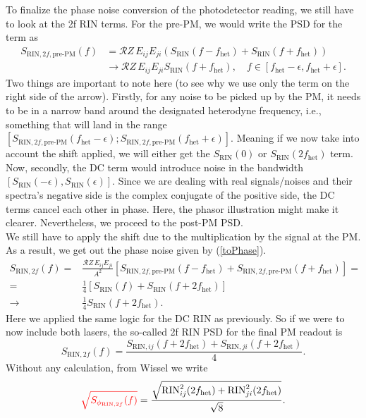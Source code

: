 \documentclass[11pt]{article}
\begin{document}
To finalize the phase noise conversion of the photodetector reading, we still have to look at the 2f RIN terms. For the pre-PM, we would write the PSD for the term as
\begin{align*}
    S_{\text{RIN},2f, \text{pre-PM}}(f) &= \mathcal{R} Z \, E_{ij} E_{ji}\left(S_{\text{RIN}}(f-f_{\text{het}})+S_{\text{RIN}}(f+f_{\text{het}})\right)\\[5pt]
    &\rightarrow \mathcal{R} Z \, E_{ij} E_{ji}S_{\text{RIN}}(f+f_{\text{het}}), \quad f\in[f_{\text{het}}-\epsilon, f_{\text{het}}+\epsilon].
\end{align*}
Two things are important to note here (to see why we use only the term on the right side of the arrow). Firstly, for any noise to be picked up by the PM, it needs to be in a narrow band around the designated heterodyne frequency, i.e., something that will land in the range $[S_{\text{RIN},2f, \text{pre-PM}}(f_{\text{het}}-\epsilon); S_{\text{RIN},2f, \text{pre-PM}}(f_{\text{het}}+\epsilon)]$. Meaning if we now take into account the shift applied, we will either get the $S_{\text{RIN}}(0)$ or $S_{\text{RIN}}(2f_{\text{het}})$ term. Now, secondly, the DC term would introduce noise in the bandwidth $[S_{\text{RIN}}(-\epsilon), S_{\text{RIN}}(\epsilon)]$. Since we are dealing with real signals/noises and their spectra's negative side is the complex conjugate of the positive side, the DC terms cancel each other in phase. Here, the phasor illustration might make it clearer. Nevertheless, we proceed to the post-PM PSD.\\
\newline
We still have to apply the shift due to the multiplication by the signal at the PM. As a result, we get out the phase noise given by (\ref{toPhase}).
\begin{align*}
    S_{\text{RIN},2f}(f) =& \frac{\mathcal{R} Z \, E_{ij} E_{ji}}{A^2}\left[S_{\text{RIN},2f, \text{pre-PM}}(f-f_{\text{het}})+ S_{\text{RIN},2f, \text{pre-PM}}(f+f_{\text{het}})\right]=\\[6pt]
    =& \frac{1}{4}\left[S_{\text{RIN}}(f)+S_{\text{RIN}}(f+2f_{\text{het}})\right]\\[6pt]
    \rightarrow& \frac{1}{4}S_{\text{RIN}}(f+2f_{\text{het}}).
\end{align*}
Here we applied the same logic for the DC RIN as previously. So if we were to now include both lasers, the so-called 2f RIN PSD for the final PM readout is 
\begin{equation*}
    S_{\text{RIN},2f}(f)=\frac{S_{\text{RIN}, ij}(f+2f_{\text{het}})+S_{\text{RIN}, ji}(f+2f_{\text{het}})}{4}.
\end{equation*}
\newline
Without any calculation, from Wissel we write
\begin{equation*}
    {\color{red}\sqrt{S_{\phi_{\text{RIN},2f}}(f)}} = \frac{\sqrt{\text{RIN}_{ij}^2(2f_{\text{het}})+\text{RIN}_{ji}^2(2f_{\text{het}})}}{\sqrt{8}}.
\end{equation*}
\end{document}
